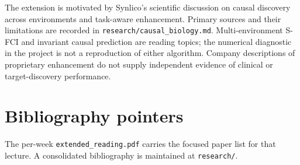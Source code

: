 \documentclass[11pt,oneside]{scrbook}
\begin{document}
The extension is motivated by Synlico's scientific discussion on causal
discovery across environments and task-aware enhancement. Primary sources and
their limitations are recorded in \texttt{research/causal\_biology.md}.
Multi-environment S-FCI and invariant causal prediction are reading topics;
the numerical diagnostic in the project is not a reproduction of either
algorithm. Company descriptions of proprietary enhancement do not supply
independent evidence of clinical or target-discovery performance.

\chapter{Bibliography pointers}
The per-week \texttt{extended\_reading.pdf} carries the focused paper list for that lecture.
A consolidated bibliography is maintained at \texttt{research/}.
\end{document}

